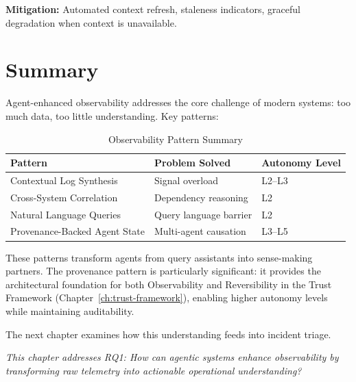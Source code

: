 \textbf{Mitigation:} Automated context refresh, staleness indicators, graceful degradation when context is unavailable.

\section{Summary}
\label{sec:observability-summary}

Agent-enhanced observability addresses the core challenge of modern systems: too much data, too little understanding. Key patterns:

\begin{table}[htbp]
\centering
\caption{Observability Pattern Summary}
\label{tab:observability-summary}
\begin{tabular}{lll}
\toprule
\textbf{Pattern} & \textbf{Problem Solved} & \textbf{Autonomy Level} \\
\midrule
Contextual Log Synthesis & Signal overload & L2--L3 \\
Cross-System Correlation & Dependency reasoning & L2 \\
Natural Language Queries & Query language barrier & L2 \\
Provenance-Backed Agent State & Multi-agent causation & L3--L5 \\
\bottomrule
\end{tabular}
\end{table}

These patterns transform agents from query assistants into sense-making partners. The provenance pattern is particularly significant: it provides the architectural foundation for both Observability and Reversibility in the Trust Framework (Chapter~\ref{ch:trust-framework}), enabling higher autonomy levels while maintaining auditability.

The next chapter examines how this understanding feeds into incident triage.

\textit{This chapter addresses RQ1: How can agentic systems enhance observability by transforming raw telemetry into actionable operational understanding?}

